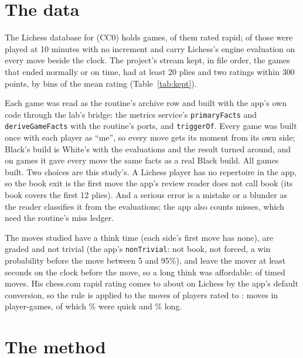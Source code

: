 \documentclass[11pt]{article}
\begin{document}
\section{The data}

The Lichess database for \Month{} (CC0) holds \GamesRead{} games, \GamesRapid{} of them rated
rapid; \GamesWithEvals{} of those were played at 10 minutes with no increment and carry Lichess's
engine evaluation on every move beside the clock. The project's stream kept, in file order, the
games that ended normally or on time, had at least 20 plies and two ratings within 300 points,
by bins of the mean rating (Table~\ref{tab:kept}).

\begin{table}[h]
\centering
\small\KeptTable
\caption{Games kept, by the players' mean rating.}
\label{tab:kept}
\end{table}

Each game was read as the routine's archive row and built with the app's own code through the
lab's bridge: the metrics service's \texttt{primaryFacts} and \texttt{deriveGameFacts} with the
routine's ports, and \texttt{triggerOf}. Every game was built once with each player as ``me'', so
every move gets its moment from its own side; Black's build is White's with the evaluations and
the result turned around, and on \BlackChecked{} games it gave every move the same facts as a real
Black build.
All \GamesBuilt{} games built. Two choices are this study's. A Lichess player has no repertoire in
the app, so the book exit is the first move the app's review reader does not call book (its book
covers the first 12 plies). And a serious error is a mistake or a blunder as the reader classifies
it from the evaluations; the app also counts misses, which need the routine's miss ledger.

The moves studied have a think time (each side's first move has none), are graded and not trivial
(the app's \texttt{nonTrivial}: not book, not forced, a win probability before the move between 5
and 95\%), and leave the mover at least \MinClock{} seconds on the clock before the move, so a long
think was affordable: \MovesAnalysed{} of \MovesTimed{} timed moves. His chess.com rapid rating
comes to about \WindowCentre{} on Lichess by the app's default conversion, so the rule is applied to
the moves of players rated \WindowLo{} to \WindowHi: \MovesPrimary{} moves in \PlayerGames{} player-games, of
which \QuickShare\% were quick and \LongShare\% long.

\section{The method}
\end{document}

